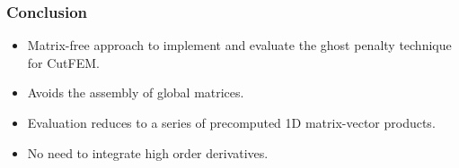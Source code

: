 \documentclass{beamer}
\begin{document}
\begin{frame}
    \frametitle{Conclusion}
    \begin{itemize}
        \item Matrix-free approach to implement and evaluate the ghost penalty technique for CutFEM.
        \item Avoids the assembly of global matrices.
        \item Evaluation reduces to a series of precomputed 1D matrix-vector products.
        \item No need to integrate high order derivatives.
    \end{itemize}
\end{frame}
\end{document}
